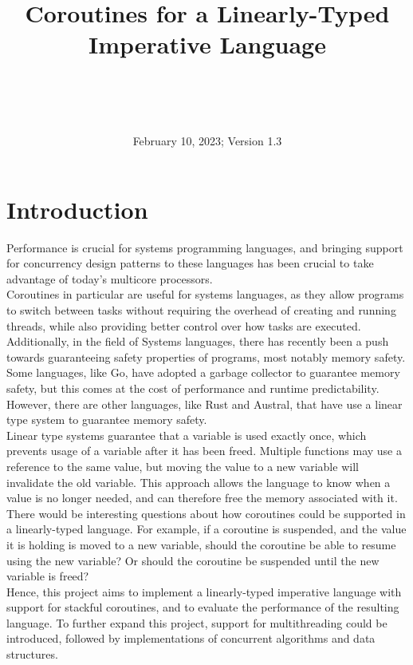 \documentclass[publish, nobox]{acmconf}
\begin{document}
\date{February 10, 2023; Version 1.3}
\title{Coroutines for a Linearly-Typed Imperative Language}
\author{\\
\\
\\
}
\maketitle
\section*{Introduction}
Performance is crucial for systems programming languages, and bringing support for concurrency design patterns to these languages has been crucial to take advantage of today's multicore processors. \\
Coroutines in particular are useful for systems languages, as they allow programs to switch between tasks without requiring the overhead of creating and running threads, while also providing better control over how tasks are executed. \\
Additionally, in the field of Systems languages, there has recently been a push towards guaranteeing safety properties of programs, most notably memory safety. Some languages, like Go, have adopted a garbage collector to guarantee memory safety, but this comes at the cost of performance and runtime predictability. However, there are other languages, like Rust and Austral, that have use a linear type system to guarantee memory safety. \\ 
Linear type systems guarantee that a variable is used exactly once, which prevents usage of a variable after it has been freed. Multiple functions may use a reference to the same value, but moving the value to a new variable will invalidate the old variable. This approach allows the language to know when a value is no longer needed, and can therefore free the memory associated with it. \\
There would be interesting questions about how coroutines could be supported in a linearly-typed language. For example, if a coroutine is suspended, and the value it is holding is moved to a new variable, should the coroutine be able to resume using the new variable? Or should the coroutine be suspended until the new variable is freed? \\
Hence, this project aims to implement a linearly-typed imperative language with support for stackful coroutines, and to evaluate the performance of the resulting language. To further expand this project, support for multithreading could be introduced, followed by implementations of concurrent algorithms and data structures.
\end{document}
